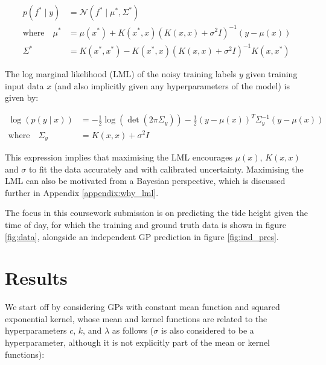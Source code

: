 \documentclass{article}
\begin{document}
\begin{align}
    p(f^* \mid y) &= \mathcal{N}\left(f^* \mid \mu^*, \Sigma^* \right) \label{eq:conditional distribution} \\
    \text{where} \quad \mu^* &= \mu(x^*) + K(x^*, x) \left( K(x, x) + \sigma^2 I \right)^{-1} (y - \mu(x)) \label{eq:conditional mean} \\
    \Sigma^* &= K(x^*, x^*) - K(x^*, x) \left( K(x, x) + \sigma^2 I \right) ^{-1} K(x, x^*) \label{eq:conditional variance}
\end{align}

The log marginal likelihood (LML) of the noisy training labels $y$ given training input data $x$ (and also implicitly given any hyperparameters of the model) is given by:


\begin{align}
    \log \left( p(y \mid x) \right) &= -\frac{1}{2}\log\left(\det \left(2\pi \Sigma_y \right)\right) -\frac{1}{2}(y - \mu(x))^T \Sigma_y^{-1} (y - \mu(x)) \\
    \text{where} \quad \Sigma_y &= K(x, x) + \sigma^2 I
\end{align}

This expression implies that maximising the LML encourages $\mu(x)$, $K(x,x)$ and $\sigma$ to fit the data accurately and with calibrated uncertainty. Maximising the LML can also be motivated from a Bayesian perspective, which is discussed further in Appendix \ref{appendix:why_lml}.

The focus in this coursework submission is on predicting the tide height given the time of day, for which the training and ground truth data is shown in figure \ref{fig:data}, alongside an independent GP prediction in figure \ref{fig:ind_pres}.


\section{Results}

We start off by considering GPs with constant mean function and squared exponential kernel, whose mean and kernel functions are related to the hyperparameters $c$, $k$, and $\lambda$ as follows ($\sigma$ is also considered to be a hyperparameter, although it is not explicitly part of the mean or kernel functions):

\end{document}
